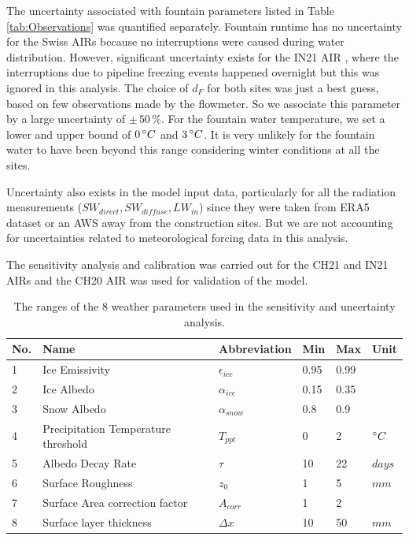 \documentclass[utf8]{frontiersSCNS} %
\begin{document}
The uncertainty associated with fountain parameters listed in Table \ref{tab:Observations} was quantified
separately. Fountain runtime has no uncertainty for the Swiss AIRs because no interruptions were caused during
water distribution. However, significant uncertainty exists for the IN21 AIR , where the interruptions due to
pipeline freezing events happened overnight but this was ignored in this analysis. The choice of $d_F$ for both
sites was just a best guess, based on few observations made by the flowmeter. So we associate this parameter by a
large uncertainty of $\pm \,50\, \%$. For the fountain water temperature, we set a lower and upper bound of $0\,
	\degree C$ and $3\, \degree C$.  It is very unlikely for the fountain water to have been beyond this range
considering winter conditions at all the sites.

Uncertainty also exists in the model input data, particularly for all the radiation measurements ($SW_{direct},
SW_{diffuse}, LW_{in}$) since they were taken from ERA5 dataset or an AWS away from the construction sites.  But we are
not accounting for uncertainties related to meteorological forcing data in this analysis.

The sensitivity analysis and calibration was carried out for the CH21 and IN21 AIRs and the CH20 AIR was used for
validation of the model.

\begin{table}
	\centering
	\caption{The ranges of the 8 weather parameters used in the sensitivity and uncertainty analysis.}
	\label{tab:parameters}
	\begin{tabular}{@{}llllll@{}}
		\toprule
		\textbf{No.} & \textbf{Name}                       & \textbf{Abbreviation} & \textbf{Min} & \textbf{Max} & \textbf{Unit} \\\midrule
		1            & Ice Emissivity                      & $\epsilon_{ice}$      & 0.95         & 0.99         &               \\
		2            & Ice Albedo                          & $\alpha_{ice}$        & 0.15         & 0.35         &               \\
		3            & Snow Albedo                         & $\alpha_{snow}$       & 0.8          & 0.9          &               \\
		4            & Precipitation Temperature threshold & $T_{ppt}$             & 0            & 2            & $\degree C$   \\
		5            & Albedo Decay Rate                   & $\tau$                & 10           & 22           & $days$        \\
		6            & Surface Roughness                   & $z_0$                 & 1            & 5            & $mm$          \\
		7            & Surface Area correction factor      & $A_{corr}$            & 1            & 2            &               \\
		8            & Surface layer thickness             & $\Delta x$            & 10           & 50           & $mm$          \\\bottomrule
	\end{tabular}
\end{table}
\end{document}
